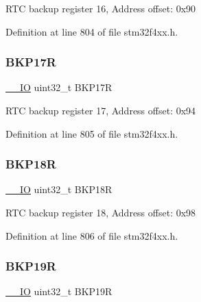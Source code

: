 R\+TC backup register 16, Address offset\+: 0x90 

Definition at line 804 of file stm32f4xx.\+h.

\mbox{\label{struct_r_t_c___type_def_a2842aa523df62f3508316eb3b2e08f4e}} 
\subsubsection{\texorpdfstring{B\+K\+P17R}{BKP17R}}
{\footnotesize\ttfamily \hyperlink{group___c_m_s_i_s__core__definitions_gaec43007d9998a0a0e01faede4133d6be}{\+\_\+\+\_\+\+IO} uint32\+\_\+t B\+K\+P17R}

R\+TC backup register 17, Address offset\+: 0x94 

Definition at line 805 of file stm32f4xx.\+h.

\mbox{\label{struct_r_t_c___type_def_a640ccb2ccfb6316b88c070362dc29339}} 
\subsubsection{\texorpdfstring{B\+K\+P18R}{BKP18R}}
{\footnotesize\ttfamily \hyperlink{group___c_m_s_i_s__core__definitions_gaec43007d9998a0a0e01faede4133d6be}{\+\_\+\+\_\+\+IO} uint32\+\_\+t B\+K\+P18R}

R\+TC backup register 18, Address offset\+: 0x98 

Definition at line 806 of file stm32f4xx.\+h.

\mbox{\label{struct_r_t_c___type_def_a4ec1dd54d976989b7c9e59fb14d974fb}} 
\subsubsection{\texorpdfstring{B\+K\+P19R}{BKP19R}}
{\footnotesize\ttfamily \hyperlink{group___c_m_s_i_s__core__definitions_gaec43007d9998a0a0e01faede4133d6be}{\+\_\+\+\_\+\+IO} uint32\+\_\+t B\+K\+P19R}

